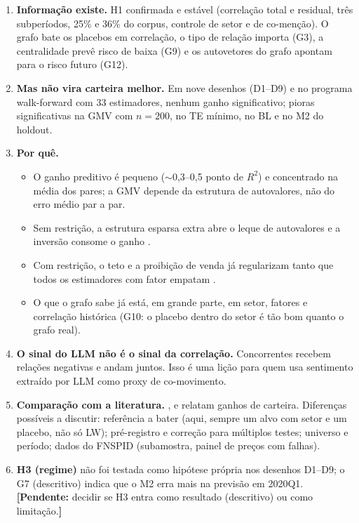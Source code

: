 \documentclass[11pt,a4paper]{article}
\newcommand{\pend}[1]{\textcolor{red!70!black}{\textbf{[Pendente:} #1\textbf{]}}}
\begin{document}
\begin{enumerate}
  \item \textbf{Informação existe.} H1 confirmada e estável (correlação total e residual, três subperíodos,
        25\% e 36\% do corpus, controle de setor e de co-menção). O grafo bate os placebos em correlação,
        o tipo de relação importa (G3), a centralidade prevê risco de baixa (G9) e os autovetores do grafo
        apontam para o risco futuro (G12).
  \item \textbf{Mas não vira carteira melhor.} Em nove desenhos (D1--D9) e no programa walk-forward com 33
        estimadores, nenhum ganho significativo; pioras significativas na GMV com $n=200$, no TE mínimo,
        no BL e no M2 do holdout.
  \item \textbf{Por quê.}
        \begin{itemize}
          \item O ganho preditivo é pequeno ($\sim$0,3--0,5 ponto de $R^2$) e concentrado na média dos pares;
                a GMV depende da estrutura de autovalores, não do erro médio par a par.
          \item Sem restrição, a estrutura esparsa extra abre o leque de autovalores e a inversão consome o
                ganho \citep{lopezdeprado2016}.
          \item Com restrição, o teto e a proibição de venda já regularizam tanto que todos os estimadores com
                fator empatam \citep{jagannathan2003}.
          \item O que o grafo sabe já está, em grande parte, em setor, fatores e correlação histórica (G10:
                o placebo dentro do setor é tão bom quanto o grafo real).
        \end{itemize}
  \item \textbf{O sinal do LLM não é o sinal da correlação.} Concorrentes recebem relações negativas e
        andam juntos. Isso é uma lição para quem usa sentimento extraído por LLM como proxy de
        co-movimento.
  \item \textbf{Comparação com a literatura.} \citet{tang2019}, \citet{becquin2023} e \citet{lu2024}
        relatam ganhos de carteira. Diferenças possíveis a discutir: referência a bater (aqui, sempre um
        alvo com setor e um placebo, não só LW); pré-registro e correção para múltiplos testes; universo e
        período; dados do FNSPID (subamostra, painel de preços com falhas).
  \item \textbf{H3 (regime)} não foi testada como hipótese própria nos desenhos D1--D9; o G7 (descritivo) indica
        que o M2 erra mais na previsão em 2020Q1. \pend{decidir se H3 entra como resultado (descritivo) ou como
        limitação.}
\end{enumerate}
\end{document}
